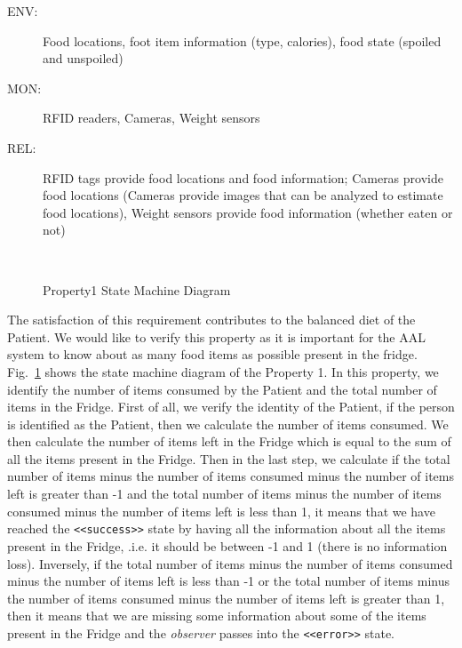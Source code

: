 \documentclass[a4paper,twoside]{article}
\begin{document}
\begin{description}
\item[ENV:] Food locations, foot item information (type, calories), food state (spoiled and unspoiled)
\item[MON:] RFID readers, Cameras, Weight sensors
\item[REL:] RFID tags provide food locations and food information; Cameras provide food locations (Cameras provide images that can be analyzed to estimate food locations), Weight sensors provide food information (whether eaten or not)
\end{description}

\begin{figure}[!h]
  \vspace{8cm}~
  \centering
  {}
  \caption{Property1 State Machine Diagram}
  \label{fig:property1stm}
 \end{figure}
 
The satisfaction of this requirement contributes to the balanced diet of the Patient. We would like to verify this property as it is important for the AAL system to know about as many food items as possible present in the fridge. Fig.~\ref{fig:property1stm} shows the state machine diagram of the Property 1. In this property, we identify the number of items consumed by the Patient and the total number of items in the Fridge. First of all, we verify the identity of the Patient, if the person is identified as the Patient, then we calculate the number of items consumed. We then calculate the number of items left in the Fridge which is equal to the sum of all the items present in the Fridge. Then in the last step, we calculate if the total number of items minus the number of items consumed minus the number of items left is greater than -1 and the total number of items minus the number of items consumed minus the number of items left is less than 1, it means that we have reached the \texttt{<<success>>} state by having all the information about all the items present in the Fridge, .i.e. it should be between -1 and 1 (there is no information loss). Inversely, if the total number of items minus the number of items consumed minus the number of items left is less than -1 or the total number of items minus the number of items consumed minus the number of items left is greater than 1, then it means that we are missing some information about some of the items present in the Fridge and the \textit{observer} passes into the \texttt{<<error>>} state.
\end{document}
